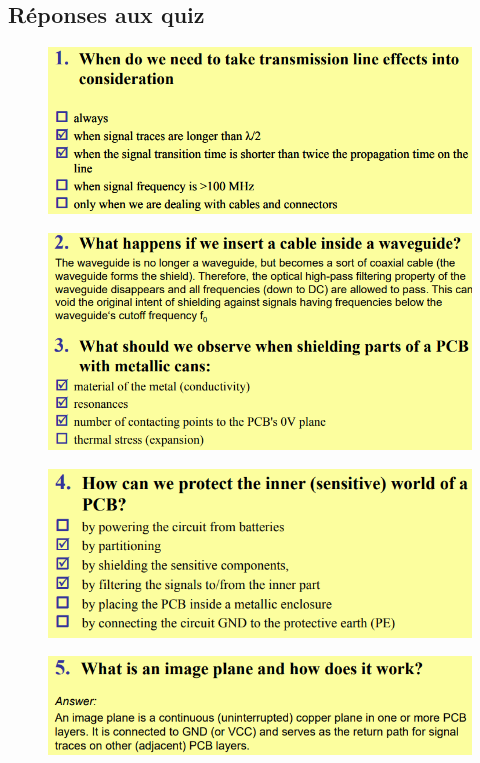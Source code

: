 \documentclass[resume]{subfiles}
\begin{document}
\begin{multicols}{3}
\subsection{Réponses aux quiz}
\begin{figure}[H]
\centering
\includegraphics[width=\columnwidth]{img_84.png}
\end{figure}
\begin{figure}[H]
\centering
\includegraphics[width=\columnwidth]{img_85.png}
\end{figure}
\begin{figure}[H]
\centering
\includegraphics[width=\columnwidth]{img_86.png}
\end{figure}
\begin{figure}[H]
\centering
\includegraphics[width=\columnwidth]{img_87.png}

\end{figure}
\end{multicols}
\end{document}
